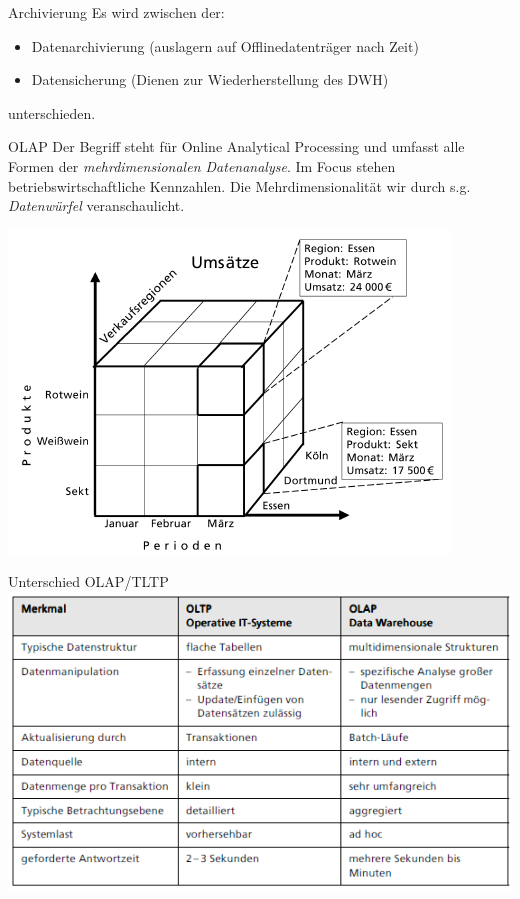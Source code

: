 \documentclass[a6paper,10pt,grid=front%
,toc
]{kartei}
\begin{document}
  \begin{karte}{Archivierung}  
    Es wird zwischen der:

    \begin{itemize}
      \item Datenarchivierung (auslagern auf Offlinedatenträger nach Zeit)
      \item Datensicherung (Dienen zur Wiederherstellung des DWH)
    \end{itemize}

    unterschieden.
  \end{karte}

  \begin{karte}{OLAP}  
    Der Begriff steht für Online Analytical Processing und umfasst alle Formen der \textit{mehrdimensionalen Datenanalyse}. Im Focus stehen betriebswirtschaftliche Kennzahlen. Die Mehrdimensionalität wir durch s.g. \textit{Datenwürfel} veranschaulicht.

    \includegraphics[height=.09\paperheight]{img/wuerfel}
  \end{karte}

  \begin{karte}{Unterschied OLAP/TLTP}  
    \includegraphics[height=.09\paperheight]{img/diff_olap_oltp}
  \end{karte}
\end{document}
